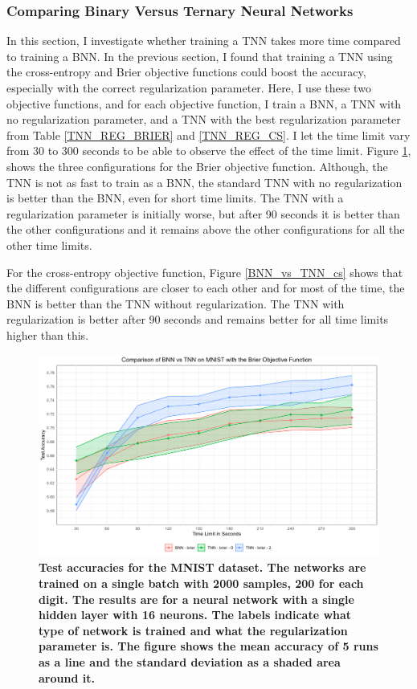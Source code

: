 \subsubsection{Comparing Binary Versus Ternary Neural Networks}
\noindent In this section, I investigate whether training a TNN takes more time compared to training a BNN. In the previous section, I found that training a TNN using the cross-entropy and Brier objective functions could boost the accuracy, especially with the correct regularization parameter. Here, I use these two objective functions, and for each objective function, I train a BNN, a TNN with no regularization parameter, and a TNN with the best regularization parameter from Table \ref{TNN_REG_BRIER} and \ref{TNN_REG_CS}. I let the time limit vary from 30 to 300 seconds to be able to observe the effect of the time limit. Figure \ref{BNN_vs_TNN_brier}, shows the three configurations for the Brier objective function. Although, the TNN is not as fast to train as a BNN, the standard TNN with no regularization is better than the BNN, even for short time limits. The TNN with a regularization parameter is initially worse, but after 90 seconds it is better than the other configurations and it remains above the other configurations for all the other time limits.

\noindent For the cross-entropy objective function, Figure \ref{BNN_vs_TNN_cs} shows that the different configurations are closer to each other and for most of the time, the BNN is better than the TNN without regularization. The TNN with regularization is better after 90 seconds and remains better for all time limits higher than this. 


\begin{figure}[H]
    \centering
    \includegraphics[width=1\linewidth]{Figures/BNN_vs_TNN_brier.png}
    \caption{\small{\textbf{Test accuracies for the MNIST dataset. The networks are trained on a single batch with 2000 samples, 200 for each digit. The results are for a neural network with a single hidden layer with 16 neurons. The labels indicate what type of network is trained and what the regularization parameter is. The figure shows the mean accuracy of 5 runs as a line and the standard deviation as a shaded area around it.}}}
    \label{BNN_vs_TNN_brier}
\end{figure}

